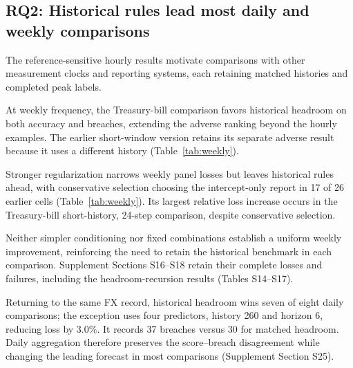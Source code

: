 \documentclass[11pt,a4paper]{article}
\begin{document}
\subsection{RQ2: Historical rules lead most daily and weekly comparisons}

The reference-sensitive hourly results motivate comparisons with other measurement clocks and reporting systems, each retaining matched histories and completed peak labels.

At weekly frequency, the Treasury-bill comparison favors historical headroom on both accuracy and breaches, extending the adverse ranking beyond the hourly examples. The earlier short-window version retains its separate adverse result because it uses a different history (Table~\ref{tab:weekly}).

Stronger regularization narrows weekly panel losses but leaves historical rules ahead, with conservative selection choosing the intercept-only report in 17 of 26 earlier cells (Table~\ref{tab:weekly}). Its largest relative loss increase occurs in the Treasury-bill short-history, 24-step comparison, despite conservative selection.

Neither simpler conditioning nor fixed combinations establish a uniform weekly improvement, reinforcing the need to retain the historical benchmark in each comparison. Supplement Sections S16--S18 retain their complete losses and failures, including the headroom-recursion results (Tables S14--S17).

Returning to the same FX record, historical headroom wins seven of eight daily comparisons; the exception uses four predictors, history 260 and horizon 6, reducing loss by 3.0\%. It records 37 breaches versus 30 for matched headroom. Daily aggregation therefore preserves the score--breach disagreement while changing the leading forecast in most comparisons (Supplement Section S25).
\end{document}
